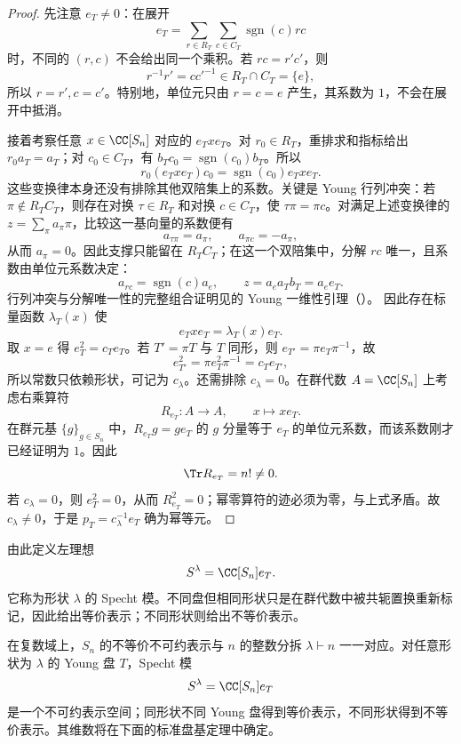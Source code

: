 \begin{proof}
先注意 $e_T\neq0$：在展开
\[
e_T=\sum_{r\in R_T}\sum_{c\in C_T}\operatorname{sgn}(c)rc
\]
时，不同的 $(r,c)$ 不会给出同一个乘积。若 $rc=r'c'$，则
\[
r^{-1}r'=cc'^{-1}\in R_T\cap C_T=\{e\},
\]
所以 $r=r',c=c'$。特别地，单位元只由 $r=c=e$ 产生，其系数为 $1$，不会在展开中抵消。

接着考察任意 $x\in\CC[S_n]$ 对应的 $e_Txe_T$。对 $r_0\in R_T$，重排求和指标给出 $r_0a_T=a_T$；对 $c_0\in C_T$，有 $b_Tc_0=\operatorname{sgn}(c_0)b_T$。所以
\[
r_0(e_Txe_T)c_0
=\operatorname{sgn}(c_0)e_Txe_T.
\]
这些变换律本身还没有排除其他双陪集上的系数。关键是 Young 行列冲突：若 $\pi\notin R_TC_T$，则存在对换 $\tau\in R_T$ 和对换 $c\in C_T$，使 $\tau\pi=\pi c$。对满足上述变换律的 $z=\sum_\pi a_\pi\pi$，比较这一基向量的系数便有
\[
a_{\tau\pi}=a_\pi,\qquad a_{\pi c}=-a_\pi,
\]
从而 $a_\pi=0$。因此支撑只能留在 $R_TC_T$；在这一个双陪集中，分解 $rc$ 唯一，且系数由单位元系数决定：
\[
a_{rc}=\operatorname{sgn}(c)a_e,
\qquad z=a_ea_Tb_T=a_e e_T.
\]
行列冲突与分解唯一性的完整组合证明见的 Young 一维性引理（）。
因此存在标量函数 $\lambda_T(x)$ 使
\[
e_Txe_T=\lambda_T(x)e_T.
\]
取 $x=e$ 得 $e_T^2=c_Te_T$。若 $T'=\pi T$ 与 $T$ 同形，则 $e_{T'}=\pi e_T\pi^{-1}$，故
\[
e_{T'}^2=\pi e_T^2\pi^{-1}=c_Te_{T'},
\]
所以常数只依赖形状，可记为 $c_\lambda$。还需排除 $c_\lambda=0$。在群代数 $A=\CC[S_n]$ 上考虑右乘算符
\[
R_{e_T}:A\to A,\qquad x\mapsto xe_T.
\]
在群元基 $\{g\}_{g\in S_n}$ 中，$R_{e_T}g=ge_T$ 的 $g$ 分量等于 $e_T$ 的单位元系数，而该系数刚才已经证明为 $1$。因此
\[
\Tr R_{e_T}=n!\neq0.
\]
若 $c_\lambda=0$，则 $e_T^2=0$，从而 $R_{e_T}^2=0$；幂零算符的迹必须为零，与上式矛盾。故 $c_\lambda\neq0$，于是 $p_T=c_\lambda^{-1}e_T$ 确为幂等元。
\end{proof}

由此定义左理想
\begin{equation}
S^\lambda=\CC[S_n]e_T.
\label{eq:specht-module}
\end{equation}
它称为形状 $\lambda$ 的 Specht 模。不同盘但相同形状只是在群代数中被共轭置换重新标记，因此给出等价表示；不同形状则给出不等价表示。

\begin{theorem}
在复数域上，$S_n$ 的不等价不可约表示与 $n$ 的整数分拆 $\lambda\vdash n$ 一一对应。对任意形状为 $\lambda$ 的 Young 盘 $T$，Specht 模
\[
S^\lambda=\CC[S_n]e_T
\]
是一个不可约表示空间；同形状不同 Young 盘得到等价表示，不同形状得到不等价表示。其维数将在下面的标准盘基定理中确定。

\end{theorem}

